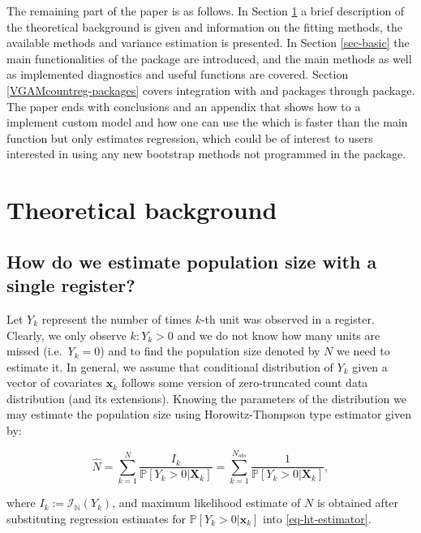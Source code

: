 \documentclass[
]{jss}
\newcommand{\1}{\mathcal{I}} \newcommand{\bZero}{\boldsymbol{0}}
\begin{document}
The remaining part of the paper is as follows. In Section
\ref{sec-theory} a brief description of the theoretical background is
given and information on the fitting methods, the available methods and
variance estimation is presented. In Section \ref{sec-basic} the main
functionalities of the package are introduced, and the main 
methods as well as implemented diagnostics and useful functions are
covered. Section \ref{VGAMcountreg-packages} covers integration with
 and  packages through 
package. The paper ends with conclusions and an appendix that shows how
to a implement custom model and how one can use the
 which is faster than the main function but
only estimates regression, which could be of interest to users
interested in using any new bootstrap methods not programmed in the
package.

\section{Theoretical background}\label{sec-theory}

\subsection{How do we estimate population size with a single
register?}\label{how-do-we-estimate-population-size-with-a-single-register}

Let \(Y_{k}\) represent the number of times \(k\)-th unit was observed
in a register. Clearly, we only observe \(k:Y_{k}>0\) and we do not know
how many units are missed (i.e.~\(Y_{k}=0\)) and to find the population
size denoted by \(N\) we need to estimate it. In general, we assume that
conditional distribution of \(Y_{k}\) given a vector of covariates
\(\boldsymbol{x}_{k}\) follows some version of zero-truncated count data
distribution (and its extensions). Knowing the parameters of the
distribution we may estimate the population size using Horowitz-Thompson
type estimator given by:

\begin{equation}
\hat{N}=
\sum_{k=1}^{N}\frac{I_{k}}{\mathbb{P}[Y_{k}>0|\boldsymbol{X}_{k}]}=
\sum_{k=1}^{N_{obs}}\frac{1}{\mathbb{P}[Y_{k}>0|\boldsymbol{X}_{k}]},
\label{eq-ht-estimator}
\end{equation}

where \(I_{k}:=\mathcal{I}_{\mathbb{N}}(Y_{k})\), and maximum likelihood
estimate of \(N\) is obtained after substituting regression estimates
for \(\mathbb{P}[Y_{k}>0|\boldsymbol{x}_{k}]\) into
\eqref{eq-ht-estimator}.
\end{document}
